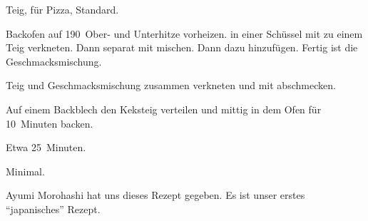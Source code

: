 \begin{recipe}{Teig, für Pizza, Standard.}
	\item[Vorbereitung] Backofen auf 190\textcelsius~Ober- und Unterhitze vorheizen.
	 in einer Schüssel mit
	 zu einem Teig verkneten. Dann separat
	 mit
	 mischen. Dann dazu
	 hinzufügen. Fertig ist die Geschmacksmischung.
	\item[Teig] Teig und Geschmacksmischung zusammen verkneten und mit 
	 abschmecken.
	\item[Backen] Auf einem Backblech den Keksteig verteilen und mittig in dem Ofen für 10~Minuten backen.
	\item[Zubereitungszeit] Etwa 25~Minuten.
	\item[Abwaschaufwand] Minimal.
\end{recipe}
Ayumi Morohashi hat uns dieses Rezept gegeben. Es ist unser erstes \enquote{japanisches} Rezept.